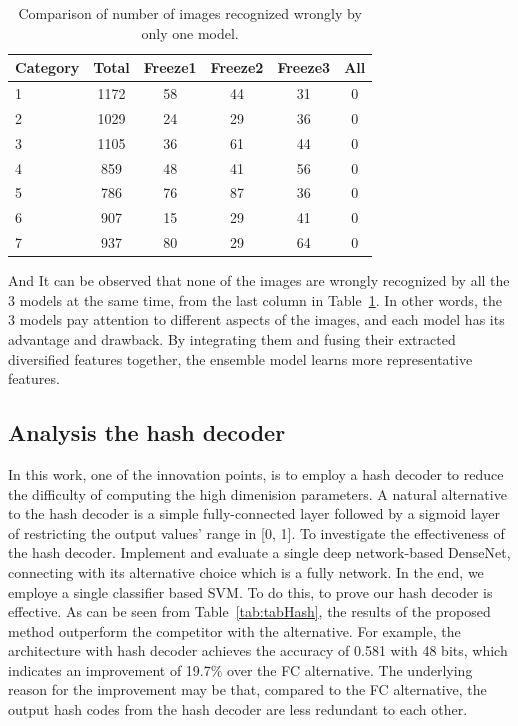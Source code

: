 \documentclass[12pt]{article}
\begin{document}
\begin{table}[ht]
  \renewcommand{\arraystretch}{1.3}
  \caption{Comparison of number of images 
  recognized wrongly by only one model.}
  \label{tab:tabFusionAny1}
  \begin{center}
  \begin{tabular}{|l|c|c|c|c|c|}
    \hline
        
        Category & Total & Freeze1 & Freeze2 
        & Freeze3 & All \\
        
        \hline
        
        1 & 1172 & 58 & 44 & 31 & 0 \\
        2 & 1029 & 24 & 29 & 36 & 0 \\
        3 & 1105 & 36 & 61 & 44 & 0 \\
        4 &  859 & 48 & 41 & 56 & 0 \\
        5 &  786 & 76 & 87 & 36 & 0 \\
        6 &  907 & 15 & 29 & 41 & 0 \\
        7 &  937 & 80 & 29 & 64 & 0 \\
        
        \hline
  \end{tabular}
  \end{center}
  \end{table}

And It can be observed that none of the images 
are wrongly recognized by all the 3 models 
at the same time, from the last column in 
Table~\ref{tab:tabFusionAny1}. 
In other words, the 3 models pay attention 
to different aspects of the images, and each 
model has its advantage and drawback.
By integrating them and fusing their 
extracted diversified features together, 
the ensemble model learns more 
representative features.

\subsection{Analysis the hash decoder}
\label{ExpHash}

In this work, one of the innovation points, is to 
employ a hash decoder to reduce the difficulty
of computing the high dimenision parameters. A 
natural alternative to the hash decoder is
a simple fully-connected layer followed by 
a sigmoid layer of restricting the output 
values’ range in [0, 1]. To investigate the 
effectiveness of the hash decoder. Implement 
and evaluate a single deep network-based
DenseNet, connecting with its alternative
choice which is a fully network. In the end,
we employe a single classifier based SVM. To
do this, to prove our hash decoder is 
effective. As can be seen from 
Table~\ref{tab:tabHash}, 
the results of the proposed method outperform 
the competitor with the alternative. For 
example, the architecture with hash decoder 
achieves the accuracy of 0.581 with 48 bits, which 
indicates an improvement of 19.7$\%$ over the 
FC alternative. The underlying reason for
the improvement may be that, compared to the 
FC alternative, the output hash codes from 
the hash decoder are less redundant to each 
other.
\end{document}
